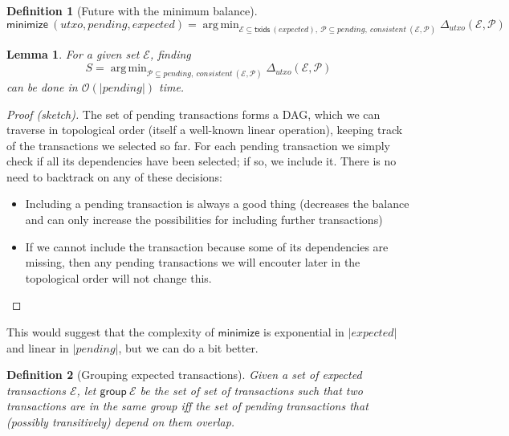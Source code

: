 \documentclass{article}
\newcommand{\order}[1]{\mathcal{O}\left(#1\right)}
\DeclareMathOperator*{\argmin}{arg\,min} %
\newtheorem{lemma}{Lemma}
\newtheorem{definition}{Definition}
\begin{document}
\begin{definition}[Future with the minimum balance]

\begin{equation*}
  \mathsf{minimize} ~ (\mathit{utxo}, \mathit{pending}, \mathit{expected})
= \argmin_{\mathcal{E} \subseteq \mathsf{txids} ~ (\mathit{expected}) ,~
           \mathcal{P} \subseteq \mathit{pending} ,~
           \mathit{consistent} ~ (\mathcal{E}, \mathcal{P})
          }
  \Delta_\mathit{utxo} (\mathcal{E}, \mathcal{P})
\end{equation*}
\end{definition}

\begin{lemma}
For a given set $\mathcal{E}$, finding
%
\begin{equation*}
S = \argmin_{\mathcal{P} \subseteq \mathit{pending} ,~
           \mathit{consistent} ~ (\mathcal{E}, \mathcal{P})
          }
    \Delta_\mathit{utxo} (\mathcal{E}, \mathcal{P})
\end{equation*}
%
can be done in $\order{|\mathit{pending}|}$ time.
\end{lemma}

\begin{proof}[Proof (sketch)]
The set of pending transactions forms a DAG, which we can traverse in
topological order (itself a well-known linear operation), keeping track of the
transactions we selected so far. For each pending transaction we simply check if
all its dependencies have been selected; if so, we include it. There is no need
to backtrack on any of these decisions:

\begin{itemize}
\item Including a pending transaction is always a good thing (decreases the
balance and can only increase the possibilities for  including further
transactions)
\item If we cannot include the transaction because some of its dependencies
are missing, then any pending transactions we will encouter later in the
topological order will not change this.
\end{itemize}
\end{proof}

This would suggest that the complexity of $\mathsf{minimize}$ is
exponential in $|\mathit{expected}|$ and linear in $|\mathit{pending}|$,
but we can do a bit better.

\begin{definition}[Grouping expected transactions]
Given a set of expected transactions $\mathcal{E}$, let
$\mathsf{group} ~ \mathcal{E}$ be the set of set of transactions such that
two transactions are in the same group iff the set of pending transactions
that (possibly transitively) depend on them overlap.
\label{def:group_expected}
\end{definition}
\end{document}

